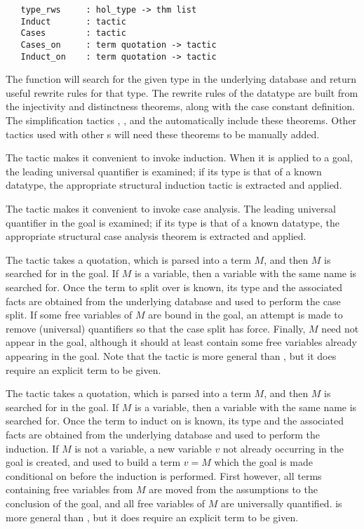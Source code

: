 \begin{verbatim}
   type_rws     : hol_type -> thm list
   Induct       : tactic
   Cases        : tactic
   Cases_on     : term quotation -> tactic
   Induct_on    : term quotation -> tactic
\end{verbatim}

%
The function  will search for the given type in the
underlying  database and return useful rewrite rules for
that type. The rewrite rules of the datatype are built from the
injectivity and distinctness theorems, along with the case constant
definition. The simplification tactics , ,
and the \simpset{}  automatically include these
theorems.  Other tactics used with other \simpset{}s will need these
theorems to be manually added.

%
The  tactic makes it convenient to invoke induction. When
it is applied to a goal, the leading universal quantifier is examined;
if its type is that of a known datatype, the appropriate structural
induction tactic is extracted and applied.

The  tactic makes it convenient to invoke case
analysis. The leading universal quantifier in the goal is examined; if
its type is that of a known datatype, the appropriate structural
case analysis theorem is extracted and applied.

The  tactic takes a quotation, which is
parsed into a term $M$, and then $M$ is searched for in the goal. If $M$
is a variable, then a variable with the same name is searched for. Once
the term to split over is known, its type and the associated facts are
obtained from the underlying database and used to perform the case
split. If some free variables of $M$ are bound in the goal, an attempt
is made to remove (universal) quantifiers so that the case split has
force. Finally, $M$ need not appear in the goal, although it should at
least contain some free variables already appearing in the goal. Note
that the  tactic is more general than , but
it does require an explicit term to be given.

The  tactic takes a quotation, which is parsed into a
term $M$, and then $M$ is searched for in the goal. If $M$ is a
variable, then a variable with the same name is searched for. Once the
term to induct on is known, its type and the associated facts are
obtained from the underlying database and used to perform the
induction.  If $M$ is not a variable, a new variable $v$ not already
occurring in the goal is created, and used to build a term $v = M$
which the goal is made conditional on before the induction is
performed. First however, all terms containing free variables from $M$
are moved from the assumptions to the conclusion of the goal, and all
free variables of $M$ are universally quantified.  is
more general than , but it does require an explicit term to
be given.

